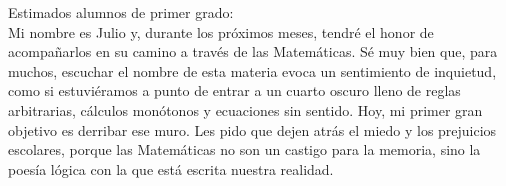 \documentclass[11pt]{report}
\begin{document}
\begin{titlepage}




\vspace{0.7em}

\raggedright Estimados alumnos de primer grado:\\

Mi nombre es Julio y, durante los próximos meses, tendré el honor de acompañarlos en su camino a través de las Matemáticas. Sé muy bien que, para muchos, escuchar el nombre de esta materia evoca un sentimiento de inquietud, como si estuviéramos a punto de entrar a un cuarto oscuro lleno de reglas arbitrarias, cálculos monótonos y ecuaciones sin sentido. Hoy, mi primer gran objetivo es derribar ese muro. Les pido que dejen atrás el miedo y los prejuicios escolares, porque las Matemáticas no son un castigo para la memoria, sino la poesía lógica con la que está escrita nuestra realidad.

\vspace{0.7em}


\end{titlepage}
\end{document}
